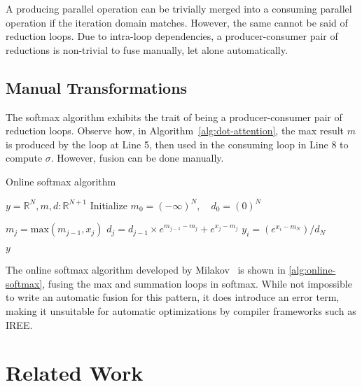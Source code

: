 \documentclass[review, anonymous, acmsmall]{acmart}
\begin{document}
A producing parallel operation can be trivially merged into a consuming parallel operation if the iteration domain matches.
However, the same cannot be said of reduction loops. Due to intra-loop dependencies, a producer-consumer pair of reductions is non-trivial to fuse manually, let alone automatically. 

\subsection{Manual Transformations}
The softmax algorithm exhibits the trait of being a producer-consumer pair of reduction loops. Observe how, in Algorithm~\ref{alg:dot-attention}, the max result $m$ is produced by the loop at Line 5, then used in the consuming loop in Line 8 to compute $\sigma$. However, fusion can be done manually.


\begin{algorithm}
  \caption{Online softmax algorithm~\cite{milakov_online_2018} \label{alg:online-softmax}}
  \begin{algorithmic}[1]
    
    \State $y = \mathbb{R}^{N}, m, d :\mathbb{R}^{N+1}$
    \State Initialize $m_0 = (-\infty)^N, \quad d_0 = (0)^N$

      \State $m_{j} = \text{max}(m_{j-1}, x_j)$
      \State $d_j = d_{j-1} \times e^{m_{j - 1} - m_j} + e^{x_j - m_j}$
    \EndFor
      \State $y_{i} = (e^{x_i - m_N}) / d_N$
    \EndFor
    
    \Return $y$
  \EndFunction
  \end{algorithmic}
\end{algorithm}

The online softmax algorithm developed by Milakov~\cite{milakov_online_2018} is shown in \autoref{alg:online-softmax}, fusing the max and summation loops in softmax. While not impossible to write an automatic fusion for this pattern, it does introduce an error term, making it unsuitable for automatic optimizations by compiler frameworks such as IREE.


\section{Related Work}
\end{document}
